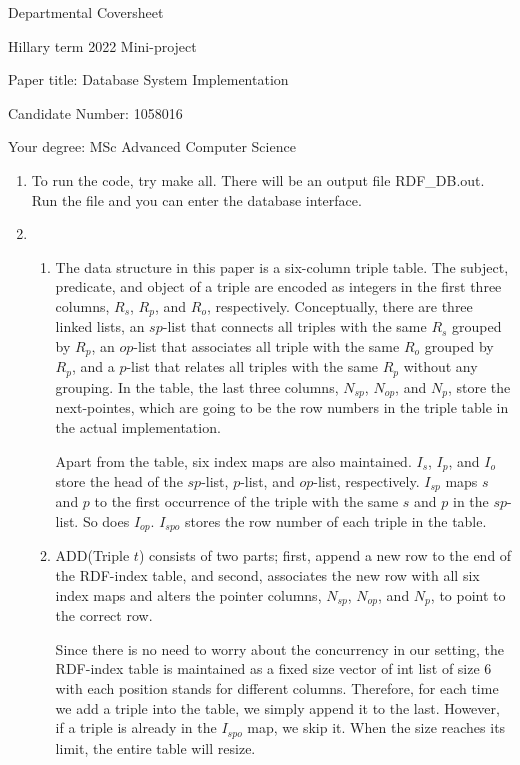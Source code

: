 \documentclass{article}
\begin{document}
Departmental Coversheet

Hillary term 2022
Mini-project

Paper title: Database System Implementation

Candidate Number: 1058016

Your degree: MSc Advanced Computer Science

\newpage

\begin{enumerate}
	\item[] To run the code, try make all. There will be an output file RDF\_DB.out. Run the file and you can enter the database interface.  
	\item 
	\begin{enumerate}
	\item 
	The data structure in this paper is a six-column triple table. The subject, predicate, and object of a triple are encoded as integers in the first three columns, $R_s$, $R_p$, and $R_o$, respectively. Conceptually, there are three linked lists, an $sp$-list that connects all triples with the same $R_s$ grouped by $R_p$, an $op$-list that associates all triple with the same $R_o$ grouped by $R_p$, and a $p$-list that relates all triples with the same $R_p$ without any grouping. In the table, the last three columns, $N_{sp}$, $N_{op}$, and $N_p$, store the next-pointes, which are going to be the row numbers in the triple table in the actual implementation.
	
	Apart from the table, six index maps are also maintained. $I_s$, $I_p$, and $I_o$ store the head of the $sp$-list, $p$-list, and $op$-list, respectively. $I_{sp}$ maps $s$ and $p$ to the first occurrence of the triple with the same $s$ and $p$ in the $sp$-list. So does $I_{op}$. $I_{spo}$ stores the row number of each triple in the table. 
	
	\item {\large A}DD(Triple $t$) consists of two parts; first, append a new row to the end of the RDF-index table, and second, associates the new row with all six index maps and alters the pointer columns, $N_{sp}$, $N_{op}$, and $N_p$, to point to the correct row.
	
	Since there is no need to worry about the concurrency in our setting, the RDF-index table is maintained as a fixed size vector of int list of size 6 with each position stands for different columns. Therefore, for each time we add a triple into the table, we simply append it to the last. However, if a triple is already in the $I_{spo}$ map, we skip it. When the size reaches its limit, the entire table will resize. 


\end{enumerate}
\end{enumerate}
\end{document}

